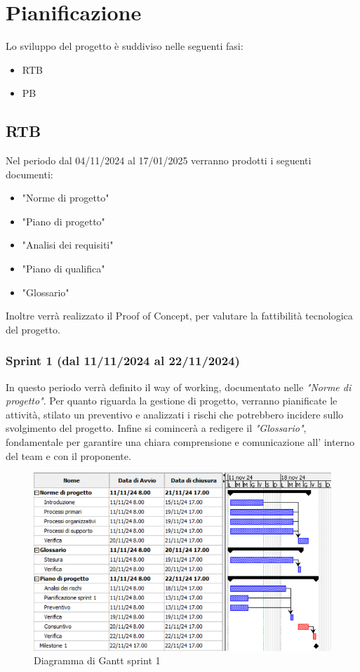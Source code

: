\section{Pianificazione}
Lo sviluppo del progetto è suddiviso nelle seguenti fasi:
    \begin{itemize}
        \item  RTB
        \item PB
    \end{itemize}
    \subsection{RTB}
    Nel periodo dal 04/11/2024 al 17/01/2025 verranno prodotti i seguenti documenti:
        \begin{itemize}
            \item "Norme di progetto"
            \item "Piano di progetto"
            \item "Analisi dei requisiti"
            \item "Piano di qualifica"
            \item "Glossario"
        \end{itemize}
    Inoltre verrà realizzato il Proof of Concept, per valutare la fattibilità tecnologica del progetto.
        \subsubsection{Sprint 1 (dal 11/11/2024 al 22/11/2024)}
        In questo periodo verrà definito il way of working, documentato nelle
        \textit{"Norme di progetto"}. Per quanto riguarda la gestione di progetto, verranno 
        pianificate le attività, stilato un preventivo e analizzati i rischi che potrebbero
        incidere sullo svolgimento del progetto. Infine si comincerà a redigere il 
        \textit{"Glossario"}, fondamentale per garantire una chiara comprensione e comunicazione all'
        interno del team e con il proponente.
        \\
        \begin{figure}[h!]
            \centering
            \includegraphics[scale = 0.85]{template/images/gantt1.png}
            \caption{Diagramma di Gantt sprint 1}
            \label{fig:3.1} %
        \end{figure}

